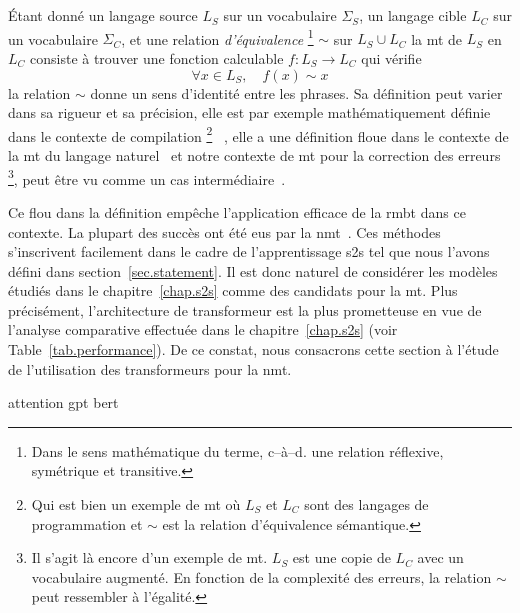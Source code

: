 \section{}

Étant donné un langage source \(L_S\) sur un vocabulaire \(\Sigma_S\),
un langage cible \(L_C\) sur un vocabulaire \(\Sigma_C\),
et une relation \emph{d'équivalence}%
\footnote{Dans le sens mathématique du terme, c--à--d. une relation réflexive, symétrique et transitive.} %
\(\sim\) sur \(L_S \cup L_C\) %
la \gls{mt} de \(L_S\) en \(L_C\) consiste à trouver une fonction calculable \(f : L_S \rightarrow L_C\)
qui vérifie 
\begin{equation}
    \label{eq:mt-equivalence}
    \forall x \in L_S, \quad f(x) \sim x
\end{equation}
la relation \(\sim\) donne un sens d'identité entre les phrases.
Sa définition peut varier dans sa rigueur et sa précision,
elle est par exemple mathématiquement définie dans le contexte de compilation%
\footnote{Qui est bien un exemple de \gls{mt} où \(L_S\) et \(L_C\) sont des langages de programmation
et \(\sim\) est la relation d'équivalence sémantique.}%
~\cite{Hadj_2015},
elle a une définition floue dans le contexte de la \gls{mt} du langage naturel~\cite{routledge}
et notre contexte de \gls{mt} pour la correction des erreurs%
\footnote{%
    Il s'agit là encore d'un exemple de \gls{mt}. \(L_S\) est une copie de \(L_C\) avec un vocabulaire augmenté.
    En fonction de la complexité des erreurs, la relation \(\sim\) peut ressembler à l'égalité.
}, %
peut être vu comme un cas intermédiaire~\cite{Bryant_Yuan_Qorib_Cao_Ng_Briscoe_2022}.

Ce flou dans la définition empêche l'application efficace de la \gls{rmbt} dans ce contexte.
La plupart des succès ont été eus par la \gls{nmt}~\cite{deep-nmt-survey}.
Ces méthodes s'inscrivent facilement dans le cadre de l'apprentissage \gls{s2s} 
tel que nous l'avons défini dans section~\ref{sec.statement}.
Il est donc naturel de considérer les modèles étudiés dans le chapitre~\ref{chap.s2s} 
comme des candidats pour la \gls{mt}.
Plus précisément, l'architecture de transformeur est la plus prometteuse en vue de l'analyse comparative
effectuée dans le chapitre~\ref{chap.s2s} (voir Table~\ref{tab.performance}).
De ce constat, nous consacrons cette section à l'étude de l'utilisation des transformeurs pour la \gls{nmt}.

{attention}
{gpt}
{bert}